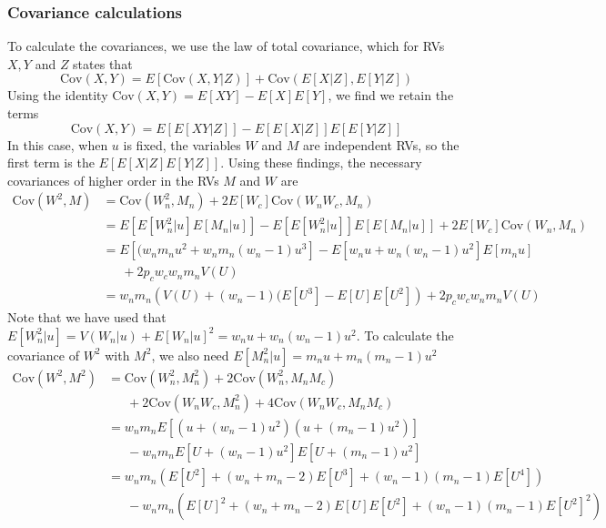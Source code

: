\documentclass{article}
\newcommand{\igjindent}{\,\,\,\,\,\,\,\,\,}
\begin{document}
\begin{appendices}
{\subsubsection{Covariance calculations}
To calculate the covariances, we use the law of total covariance, which for RVs $X,Y$ and $Z$ states that
\begin{equation*}
    \mathrm{Cov}(X,Y)=E[\mathrm{Cov}(X,Y|Z)]+\mathrm{Cov}(E[X|Z],E[Y|Z])
\end{equation*}
Using the identity $\mathrm{Cov}(X,Y)=E[XY]-E[X]E[Y]$, we find we retain the terms
\begin{equation*}
    \mathrm{Cov}(X,Y)=E[E[XY|Z]]-E[E[X|Z]]E[E[Y|Z]]
\end{equation*}
In this case, when $u$ is fixed, the variables $W$ and $M$ are independent RVs, so the first term is the $E[E[X|Z]E[Y|Z]]$. Using these findings, the necessary covariances of higher order in the RVs $M$ and $W$ are
\begin{equation}
    \begin{split}
    \mathrm{Cov}(W^2,M)&=\mathrm{Cov}(W_n^2,M_n)+
            2E[W_c]\mathrm{Cov}(W_nW_c,M_n)\\
        &=E[E[W_n^2|u]E[M_n|u]]-E[E[W_n^2|u]]E[E[M_n|u]]+2E[W_c]\mathrm{Cov}(W_n,M_n)\\
        &=E[(w_nm_nu^2+w_nm_n(w_n-1)u^3]-E[w_nu+w_n(w_n-1)u^2]E[m_nu]\\
        &\igjindent +2p_cw_cw_nm_nV(U)\\
        &=w_nm_n\left(V(U)+(w_n-1)(E[U^3]-E[U]E[U^2]\right)+2p_cw_cw_nm_nV(U)
    \end{split}
\end{equation}
Note that we have used that $E[W_n^2|u]=V(W_n|u)+E[W_n|u]^2=w_nu+w_n(w_n-1)u^2$. To calculate the covariance of $W^2$ with $M^2$, we also need $E[M_n^2|u]=m_nu+m_n(m_n-1)u^2$
\begin{equation}
    \begin{split}
    \mathrm{Cov}(W^2,M^2)&=\mathrm{Cov}(W_n^2,M_n^2)+
            2\mathrm{Cov}(W_n^2,M_nM_c)\\
            &\igjindent +2\mathrm{Cov}(W_nW_c,M_n^2)
             +4\mathrm{Cov}(W_nW_c,M_nM_c)\\
    &=w_nm_nE[(u+(w_n-1)u^2)(u+(m_n-1)u^2)]\\
    &\igjindent -w_nm_nE[U+(w_n-1)u^2]E[U+(m_n-1)u^2]\\
    &=w_nm_n(E[U^2]+(w_n+m_n-2)E[U^3]+(w_n-1)(m_n-1)E[U^4])\\
    &\igjindent -w_nm_n(E[U]^2+(w_n+m_n-2)E[U]E[U^2]+(w_n-1)(m_n-1)E[U^2]^2)\\

\end{split}
\end{equation}}
\end{appendices}
\end{document}
